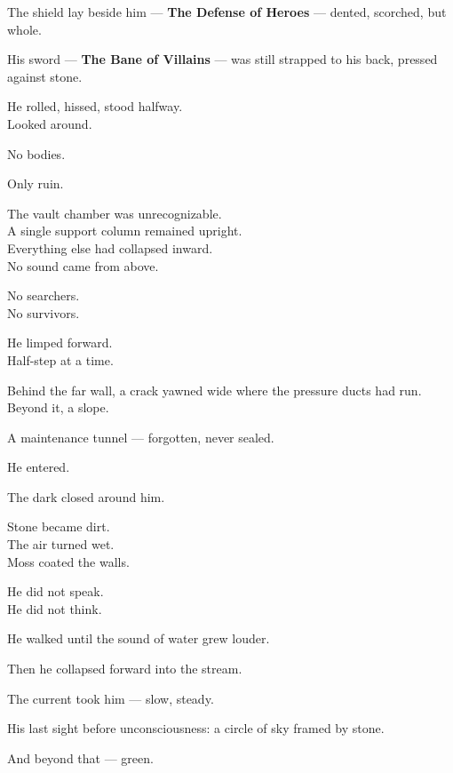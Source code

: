 \documentclass[12pt]{article}
\begin{document}
The shield lay beside him — \textbf{The Defense of Heroes} — dented, scorched, but whole.

His sword — \textbf{The Bane of Villains} — was still strapped to his back, pressed against stone.

He rolled, hissed, stood halfway.\\
Looked around.

No bodies.

Only ruin.

\vspace{1em}

The vault chamber was unrecognizable.\\
A single support column remained upright.\\
Everything else had collapsed inward.\\
No sound came from above.

No searchers.\\
No survivors.

He limped forward.\\
Half-step at a time.

\vspace{1em}

Behind the far wall, a crack yawned wide where the pressure ducts had run.\\
Beyond it, a slope.

A maintenance tunnel — forgotten, never sealed.

He entered.

\vspace{1em}

The dark closed around him.

Stone became dirt.\\
The air turned wet.\\
Moss coated the walls.

He did not speak.\\
He did not think.

He walked until the sound of water grew louder.

Then he collapsed forward into the stream.

The current took him — slow, steady.

\vspace{1em}

His last sight before unconsciousness: a circle of sky framed by stone.

And beyond that — green.

\dotfill
\end{document}
